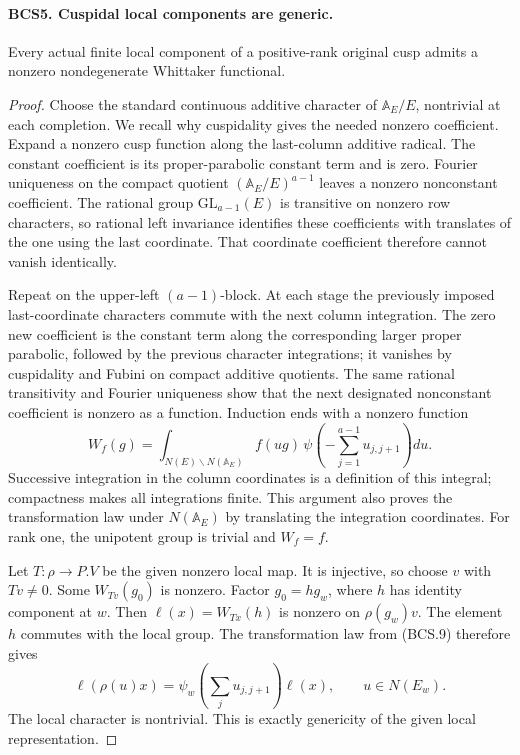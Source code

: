 \documentclass[11pt,a4paper]{article}
\numberwithin{equation}{section}
\theoremstyle{remark}\newtheorem{remark}[theorem]{Remark}
\begin{document}
\paragraph{BCS5. Cuspidal local components are generic.}
\label{claim:BCS5}
Every actual finite local component of a positive-rank original cusp
admits a nonzero nondegenerate Whittaker functional.
\begin{proof}
Choose the standard continuous additive character of
\(\mathbb A_E/E\), nontrivial at each completion.  We recall why
cuspidality gives the needed nonzero coefficient.  Expand a nonzero
cusp function along the last-column additive radical.  The constant
coefficient is its proper-parabolic constant term and is zero.
Fourier uniqueness on the compact quotient
\((\mathbb A_E/E)^{a-1}\) leaves a nonzero nonconstant coefficient.
The rational group \(\mathrm{GL}_{a-1}(E)\) is transitive on
nonzero row characters, so rational left invariance identifies these
coefficients with translates of the one using the last coordinate.
That coordinate coefficient therefore cannot vanish identically.

Repeat on the upper-left \((a-1)\)-block.  At each stage the
previously imposed last-coordinate characters commute with the next
column integration.  The zero new coefficient is the constant term
along the corresponding larger proper parabolic, followed by the
previous character integrations; it vanishes by cuspidality and
Fubini on compact additive quotients.  The same rational transitivity
and Fourier uniqueness show that the next designated nonconstant
coefficient is nonzero as a function.  Induction ends with a
nonzero function
\[
 W_f(g)=\int_{N(E)\backslash N(\mathbb A_E)}
     f(ug)\,\psi\!\left(-\sum_{j=1}^{a-1}u_{j,j+1}\right)du.
 \tag{BCS.9}
\]
Successive integration in the column coordinates is a definition of
this integral; compactness makes all integrations finite.  This
argument also proves the transformation law under \(N(\mathbb A_E)\)
by translating the integration coordinates.  For rank one, the
unipotent group is trivial and \(W_f=f\).

Let \(T:\rho\to P.V\) be the given nonzero local map.  It is
injective, so choose \(v\) with \(Tv\ne0\).  Some
\(W_{Tv}(g_0)\) is nonzero.  Factor \(g_0=h g_w\), where \(h\)
has identity component at \(w\).  Then
\(\ell(x)=W_{Tx}(h)\) is nonzero on \(\rho(g_w)v\).
The element \(h\) commutes with the local group.  The transformation
law from (BCS.9) therefore gives
\[
 \ell(\rho(u)x)=\psi_w\!\left(\sum_j u_{j,j+1}\right)\ell(x),
                         \qquad u\in N(E_w).
\]
The local character is nontrivial.  This is exactly genericity of
the given local representation.
\end{proof}
\end{document}
